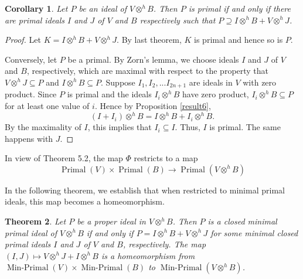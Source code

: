 \documentclass{birkjour}
\newtheorem{thm}{Theorem}[section]
\newtheorem{cor}[thm]{Corollary}
\theoremstyle{definition}
\theoremstyle{remark}
\numberwithin{equation}{section}
\begin{document}
\begin{cor} \label{sec5cor}
    Let $P$ be an ideal of $V \otimes^h B$. Then $P$ is primal if and only if there are  primal ideals $I$ and $J$ of $V$ and $B$ respectively such that $P \supseteq I \otimes^h B + V \otimes^h J$. 
\end{cor}

\begin{proof}
    Let $K= I \otimes^h B + V \otimes^h J$. By last theorem, $K$ is primal and hence so is $P$. 
    
    
    
    
    Conversely, let $P$ be a primal. By Zorn's lemma, we choose ideals $I$ and $J$ of $V$ and $B$, respectively, which are maximal with respect to the property that $V \otimes^h J \subseteq P$ and $I \otimes^h B \subseteq P$. Suppose $I_1, I_2,...I_{2n+1}$ are  ideals in $V$ with zero product. Since $P$ is primal and the  ideals $I_i \otimes^h B$ have zero product, $I_i \otimes^h B \subseteq P $ for at least one value of $i$. Hence by Proposition \ref{result6}, $$(I+I_i)\otimes^h B = I \otimes^h B+ I_i \otimes^h B  .$$ By the maximality of $I$, this implies that $I_i \subseteq I$. Thus, $I$ is primal. The same happens with $J$.
\end{proof}










In view of Theorem 5.2, the map $\Phi$ restricts to a map 
\[
\operatorname{Primal}(V) \times \operatorname{Primal}(B) \to \operatorname{Primal}(V \otimes^h B)
\]

In the following theorem, we establish that when restricted to minimal primal ideals, this map becomes a homeomorphism.




\begin{thm} \label{miniprimal}
    Let $P$ be a proper ideal in $V \otimes^h B$. Then $P$ is a closed minimal primal ideal of $V \otimes^h B$ if and only if $P = I \otimes^h B + V \otimes^h J$ for some minimal closed primal ideals $I$ and $J$ of $V$ and $B$, respectively. The map $(I, J) \mapsto V \otimes^h J + I \otimes^h B$ is a homeomorphism from $\operatorname{Min-Primal}(V) \times \operatorname{Min-Primal}(B)$ to $\operatorname{Min-Primal}(V \otimes^h B)$.
\end{thm}
\end{document}

